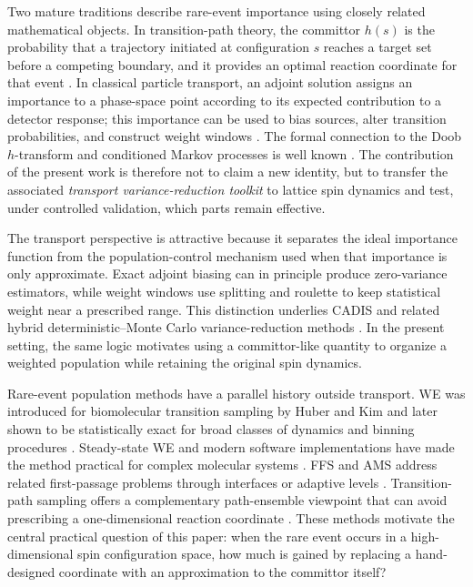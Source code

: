 \documentclass[a4paper,fleqn]{cas-sc}
\begin{document}
Two mature traditions describe rare-event importance using closely related mathematical objects. In transition-path theory, the committor $h(s)$ is the probability that a trajectory initiated at configuration $s$ reaches a target set before a competing boundary, and it provides an optimal reaction coordinate for that event \citep{e2006,metzner2009,vanden2010}. In classical particle transport, an adjoint solution assigns an importance to a phase-space point according to its expected contribution to a detector response; this importance can be used to bias sources, alter transition probabilities, and construct weight windows \citep{lewins1965,spanier1969,bell1970,wagner1998,haghighat2003}. The formal connection to the Doob $h$-transform and conditioned Markov processes is well known \citep{doob1984,touchette2009,chetrite2015}. The contribution of the present work is therefore not to claim a new identity, but to transfer the associated \emph{transport variance-reduction toolkit} to lattice spin dynamics and test, under controlled validation, which parts remain effective.

The transport perspective is attractive because it separates the ideal importance function from the population-control mechanism used when that importance is only approximate. Exact adjoint biasing can in principle produce zero-variance estimators, while weight windows use splitting and roulette to keep statistical weight near a prescribed range. This distinction underlies CADIS and related hybrid deterministic--Monte Carlo variance-reduction methods \citep{wagner1998,haghighat2003,wagner2014}. In the present setting, the same logic motivates using a committor-like quantity to organize a weighted population while retaining the original spin dynamics.

Rare-event population methods have a parallel history outside transport. WE was introduced for biomolecular transition sampling by Huber and Kim and later shown to be statistically exact for broad classes of dynamics and binning procedures \citep{huber1996,zhang2010exact}. Steady-state WE and modern software implementations have made the method practical for complex molecular systems \citep{bhatt2010,russo2022}. FFS and AMS address related first-passage problems through interfaces or adaptive levels \citep{allen2009,valeriani2007,cerou2007}. Transition-path sampling offers a complementary path-ensemble viewpoint that can avoid prescribing a one-dimensional reaction coordinate \citep{dellago1998,bolhuis2002}. These methods motivate the central practical question of this paper: when the rare event occurs in a high-dimensional spin configuration space, how much is gained by replacing a hand-designed coordinate with an approximation to the committor itself?
\end{document}
